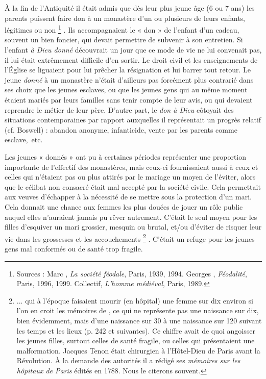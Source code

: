  À la fin de l'Antiquité il était admis que dès leur plus jeune âge (6 ou 7 ans) les parents puissent faire don à un monastère d'un ou plusieurs de leurs enfants, légitimes ou non%
\footnote{Sources : Marc , \emph{La société féodale}, Paris, 1939, 1994. Georges , \emph{Féodalité}, Paris, 1996, 1999. Collectif, \emph{L'homme médiéval}, Paris, 1989.}%
. Ils accompagnaient le « don » de l'enfant d'un cadeau, souvent un bien foncier, qui devait permettre de subvenir à son entretien. Si l'enfant \emph{à Dieu donné} découvrait un jour que ce mode de vie ne lui convenait pas, il lui était extrêmement difficile d'en sortir. Le droit civil et les enseignements de l'Église se liguaient pour lui prêcher la résignation et lui barrer tout retour. Le jeune \emph{donné} à un monastère n'était d'ailleurs pas forcément plus contrarié dans ses choix que les jeunes esclaves, ou que les jeunes gens qui au même moment étaient mariés par leurs familles sans tenir compte de leur avis, ou qui devaient reprendre le métier de leur père. D'autre part, le \emph{don à Dieu} côtoyait des situations contemporaines par rapport auxquelles il représentait un progrès relatif (cf. {Boswell}) : abandon anonyme, infanticide, vente par les parents comme esclave,~etc. 


Les jeunes « donnés » ont pu à certaines périodes représenter une proportion importante de l'effectif des monastères, mais ceux-ci fournissaient aussi à ceux et celles qui n'étaient pas ou plus attirés par le mariage un moyen de l'éviter, alors que le célibat non consacré était mal accepté par la société civile. Cela permettait aux veuves d'échapper à la nécessité de se mettre sous la protection d'un mari. Cela donnait une chance aux femmes les plus douées de jouer un rôle public auquel elles n'auraient jamais pu rêver autrement. C'était le seul moyen pour les filles d'esquiver un mari grossier, mesquin ou brutal, et/ou d'éviter de risquer leur vie dans les grossesses et les accouchements%
\footnote{... qui à l'époque faisaient mourir (en hôpital) une femme sur dix environ si l'on en croit les mémoires de , ce qui ne représente pas une naissance sur dix, bien évidemment, mais d'une naissance sur 30 à une naissance sur 120 suivant les temps et les lieux (p. 242 et suivantes). Ce chiffre avait de quoi angoisser les jeunes filles, surtout celles de santé fragile, ou celles qui présentaient une malformation. Jacques Tenon était chirurgien à l'Hôtel-Dieu de Paris avant la Révolution. À la demande des autorités il a rédigé ses \emph{mémoires sur les hôpitaux de Paris} édités en 1788. Nous le citerons souvent.}%
. C'était un refuge pour les jeunes gens mal conformés ou de santé trop fragile. 

